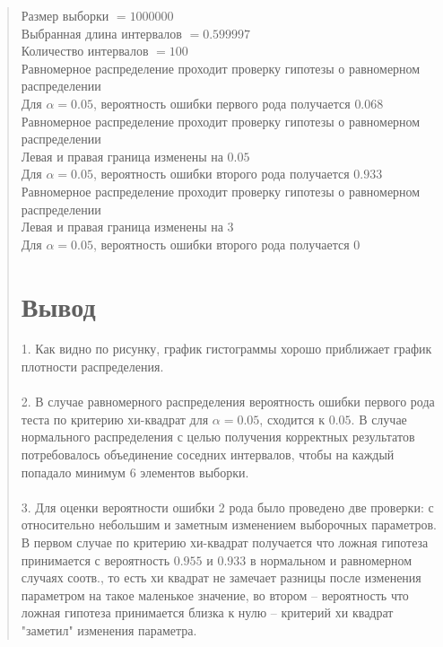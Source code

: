 \documentclass{article}
\begin{document}
\begin{quote}
	Размер выборки $= 1000000$ \\
	Выбранная длина интервалов $= 0.599997$ \\
	Количество интервалов $= 100$ \\

	Равномерное распределение проходит проверку гипотезы о равномерном распределении \\
	Для $\alpha = 0.05$, вероятность ошибки первого рода получается $0.068$ \\

	Равномерное распределение проходит проверку гипотезы о равномерном распределении \\ 
	Левая и правая граница изменены на $0.05$ \\
	Для $\alpha = 0.05$, вероятность ошибки второго рода получается $0.933$ \\

	Равномерное распределение проходит проверку гипотезы о равномерном распределении \\
	Левая и правая граница изменены на $3$ \\
	Для $\alpha = 0.05$, вероятность ошибки второго рода получается $0$
\section{Вывод}
	1. Как видно по рисунку, график гистограммы хорошо приближает график плотности распределения. \\ \\
	2. В случае равномерного распределения вероятность ошибки первого рода теста по критерию хи-квадрат для $\alpha = 0.05$, сходится к $0.05$. В случае нормального распределения с целью получения корректных результатов потребовалось объединение соседних интервалов, чтобы на каждый попадало минимум 6 элементов выборки. \\ \\
	3. Для оценки вероятности ошибки 2 рода было проведено две проверки: с относительно небольшим и заметным изменением выборочных параметров. В первом случае по критерию хи-квадрат получается что ложная гипотеза принимается с вероятность $0.955$ и $0.933$ в нормальном и равномерном случаях соотв., то есть хи квадрат не замечает разницы после изменения параметром на такое маленькое значение, во втором -- вероятность что ложная гипотеза принимается близка к нулю -- критерий хи квадрат "заметил" изменения параметра.


\end{quote}
\end{document}
